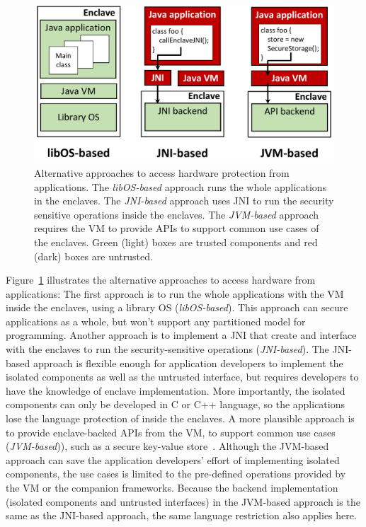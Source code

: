 \begin{figure}[t!]
\centering
\includegraphics[width=\linewidth]{figures/alternatives.pdf}
\footnotesize
\caption{Alternative approaches to access \sgx{} hardware protection from \java{} applications.
The {\em libOS-based} approach runs the whole \java{} applications in the enclaves. 
The {\em JNI-based} approach uses JNI to run the security sensitive operations inside the enclaves.
The {\em JVM-based} approach requires the \java{} VM to provide APIs to support common use cases of the enclaves.
Green (light) boxes are trusted components and red (dark) boxes are untrusted.
}
\label{fig:alternatives}
\end{figure}


Figure~\ref{fig:alternatives} illustrates the alternative approaches
to access \sgx{} hardware from \java{} applications:
The first approach is to run the whole \java{} applications with the \java{} VM inside the enclaves,
using a library OS ({\em libOS-based}).
This approach can secure applications as a whole,
but won't support any partitioned model for programming.
Another approach is to implement a JNI that create and interface with the enclaves
to run the security-sensitive operations ({\em JNI-based}).
The JNI-based approach is flexible enough for application developers
to implement the isolated components as well as the untrusted interface,
but requires developers to have the knowledge of
enclave implementation.
More importantly, the isolated components can only be developed in C or C++
language, so the applications lose the language protection of \java{} inside the enclaves.
A more plausible approach is to provide enclave-backed APIs
from the \java{} VM,
to support common use cases ({\em JVM-based})), such as a secure key-value store~\cite{vc3}.
Although the JVM-based approach can save the application developers' effort
of implementing isolated components,
the use cases is limited to the pre-defined operations provided by the \java{} VM or the companion frameworks.
Because the backend implementation (isolated components and untrusted interfaces) in the JVM-based approach is the same as the JNI-based approach,
the same language restriction also applies here. 

